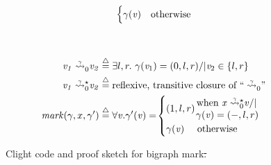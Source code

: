 \documentclass[acmsmall,screen]{acmart}  %
\newcommand{\reachable}[5]{\ensuremath{{\m{#1}\;\accentset{#2}{\leadsto}^{#3}_{#4} \m{#5}}}} %
\newcommand{\defeq}{\mathbin{\stackrel{\triangle}{=}}} %
\providecommand{\DIFdel}[1]{{\protect\color{red}\sout{#1}}}                      %
\providecommand{\DIFdelFL}[1]{\DIFdel{#1}} %
\providecommand{\DIFaddbeginFL}{} %
\providecommand{\DIFaddendFL}{} %
\providecommand{\DIFdelbeginFL}{} %
\providecommand{\DIFdelendFL}{} %
\newcommand{\DIFscaledelfig}{0.5}
\newlength{\DIFdelgraphicswidth} %
\newlength{\DIFdelgraphicsheight} %
\newcommand{\DIFaddincludegraphics}[2][]{{\color{blue}\fbox{\DIFOincludegraphics[#1]{#2}}}} %
\newcommand{\DIFdelincludegraphics}[2][]{%
\sbox{\DIFdelgraphicsbox}{\DIFOincludegraphics[#1]{#2}}%
\settoboxwidth{\DIFdelgraphicswidth}{\DIFdelgraphicsbox} %
\settoboxtotalheight{\DIFdelgraphicsheight}{\DIFdelgraphicsbox} %
\scalebox{\DIFscaledelfig}{%
\parbox[b]{\DIFdelgraphicswidth}{\usebox{\DIFdelgraphicsbox}\\[-\baselineskip] \rule{\DIFdelgraphicswidth}{0em}}\llap{\resizebox{\DIFdelgraphicswidth}{\DIFdelgraphicsheight}{%
\setlength{\unitlength}{\DIFdelgraphicswidth}%
\begin{picture}(1,1)%
\thicklines\linethickness{2pt} %
{\color[rgb]{1,0,0}\put(0,0){\framebox(1,1){}}}%
{\color[rgb]{1,0,0}\put(0,0){\line( 1,1){1}}}%
{\color[rgb]{1,0,0}\put(0,1){\line(1,-1){1}}}%
\end{picture}%
}\hspace*{3pt}}} %
} %
\DeclareRobustCommand{\DIFaddbeginFL}{\DIFOaddbeginFL \let\includegraphics\DIFaddincludegraphics} %
\DeclareRobustCommand{\DIFaddendFL}{\DIFOaddendFL \let\includegraphics\DIFOincludegraphics} %
\DeclareRobustCommand{\DIFdelbeginFL}{\DIFOdelbeginFL \let\includegraphics\DIFdelincludegraphics} %
\DeclareRobustCommand{\DIFdelendFL}{\DIFOaddendFL \let\includegraphics\DIFOincludegraphics} %
\begin{document}
\begin{figure}[t]
{\begin{flushleft}
\begin{minipage}[c]{0.55\textwidth}
\begin{equation*}
\begin{array}{l@{\hspace{2pt}}c@{\hspace{2pt}}l}
\begin{cases}
\gamma(\m{v}) & \text{otherwise}
\end{cases}
\end{array}
\end{equation*}
\end{minipage}
~~ \vline
\begin{minipage}[c]{0.4\textwidth}
\begin{equation*}
\DIFdelbeginFL %
\DIFdelendFL \DIFaddbeginFL \begin{split}
\reachable{v_1}{\gamma}{}{0}{v_2}\;\defeq\; &\exists l,r.~ \gamma(\m{v}_1) = (0,l,r) /| \m{v}_2 \in \{ l,r\} \\
\reachable{v_1}{\gamma}{\star}{0}{v_2}\;\defeq\;&\text{reflexive, transitive closure of ``} \reachable{}{\gamma}{}{0}{}\text{''}
\\
\;\; \m{mark}(\gamma,x,\gamma')\;\defeq\;&
\forall \m{v}. \gamma'(\m{v}) = \!
\begin{cases}
(1,l,r) \!
\begin{array}{@{}l@{}}\text{ when }
\reachable{x}{\gamma}{\star}{0}{v} /| \null \\[-2pt] \; \gamma(\m{v}) = (-,l,r)
\end{array}\\
\gamma(\m{v}) \quad \text{ otherwise}
\end{cases}
\end{split}
\DIFaddendFL \end{equation*}
\end{minipage}
\end{flushleft}
}

\vspace{-0.4em}
\caption{Clight code and proof sketch for bigraph mark\DIFdelbeginFL \DIFdelFL{.}\DIFdelendFL }
\label{fig:markgraph}
\vspace{-1em}
\end{figure}
\end{document}
